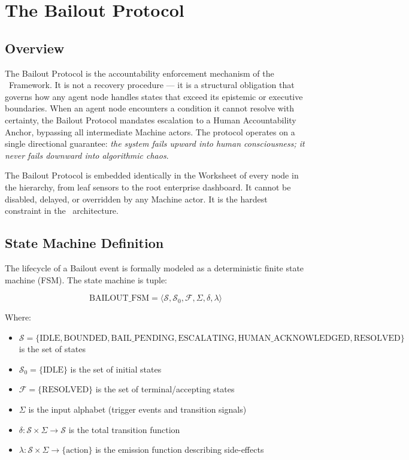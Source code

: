\section{The Bailout Protocol}

\subsection{Overview}

The Bailout Protocol is the accountability enforcement mechanism of the \bxthree\ Framework. It is not a recovery procedure --- it is a structural obligation that governs how any agent node handles states that exceed its epistemic or executive boundaries. When an agent node encounters a condition it cannot resolve with certainty, the Bailout Protocol mandates escalation to a Human Accountability Anchor, bypassing all intermediate Machine actors. The protocol operates on a single directional guarantee: \emph{the system fails upward into human consciousness; it never fails downward into algorithmic chaos}.

The Bailout Protocol is embedded identically in the Worksheet of every node in the hierarchy, from leaf sensors to the root enterprise dashboard. It cannot be disabled, delayed, or overridden by any Machine actor. It is the hardest constraint in the \bxthree\ architecture.

\subsection{State Machine Definition}

The lifecycle of a Bailout event is formally modeled as a deterministic finite state machine (FSM). The state machine is tuple:

\[
\text{BAILOUT\_FSM} = \langle \mathcal{S}, \mathcal{S}_0, \mathcal{F}, \Sigma, \delta, \lambda \rangle
\]

Where:

\begin{itemize}
  \item $\mathcal{S} = \{\text{IDLE}, \text{BOUNDED}, \text{BAIL\_PENDING}, \text{ESCALATING}, \text{HUMAN\_ACKNOWLEDGED}, \text{RESOLVED}\}$ is the set of states
  \item $\mathcal{S}_0 = \{\text{IDLE}\}$ is the set of initial states
  \item $\mathcal{F} = \{\text{RESOLVED}\}$ is the set of terminal/accepting states
  \item $\Sigma$ is the input alphabet (trigger events and transition signals)
  \item $\delta: \mathcal{S} \times \Sigma \to \mathcal{S}$ is the total transition function
  \item $\lambda: \mathcal{S} \times \Sigma \to \{\text{action}\}$ is the emission function describing side-effects
\end{itemize}


